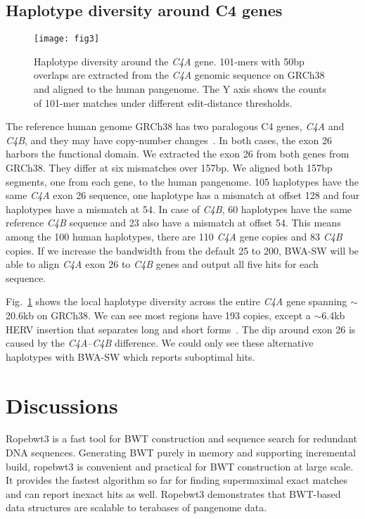 \documentclass[webpdf,contemporary,large,namedate]{oup-authoring-template}%
\begin{document}
\subsection{Haplotype diversity around C4 genes}

\begin{figure}[tb]
\texttt{[image: fig3]}
\caption{Haplotype diversity around the \emph{C4A} gene.
101-mers with 50bp overlaps are extracted from the \emph{C4A} genomic sequence on GRCh38
and aligned to the human pangenome.
The Y axis shows the counts of 101-mer matches under different edit-distance thresholds.}\label{fig:c4}
\end{figure}

The reference human genome GRCh38 has two paralogous C4 genes, \emph{C4A} and \emph{C4B}, and they may have copy-number changes~\citep{Sekar:2016aa}.
In both cases, the exon 26 harbors the functional domain.
We extracted the exon 26 from both genes from GRCh38.
They differ at six mismatches over 157bp.
We aligned both 157bp segments, one from each gene, to the human pangenome.
105 haplotypes have the same \emph{C4A} exon 26 sequence, one haplotype has a mismatch at offset 128 and four haplotypes have a mismatch at 54.
In case of \emph{C4B}, 60 haplotypes have the same reference \emph{C4B} sequence and 23 also have a mismatch at offset 54.
This means among the 100 human haplotypes, there are 110 \emph{C4A} gene copies and 83 \emph{C4B} copies.
If we increase the bandwidth from the default 25 to 200, BWA-SW will be able to align \emph{C4A} exon 26 to \emph{C4B} genes
and output all five hits for each sequence.

Fig.~\ref{fig:c4} shows the local haplotype diversity across the entire \emph{C4A} gene spanning $\sim$20.6kb on GRCh38.
We can see most regions have 193 copies, except a $\sim$6.4kb HERV insertion that separates long and short forms~\citep{Sekar:2016aa}.
The dip around exon 26 is caused by the \emph{C4A}--\emph{C4B} difference.
We could only see these alternative haplotypes with BWA-SW which reports suboptimal hits.

\section{Discussions}

Ropebwt3 is a fast tool for BWT construction and sequence search for redundant DNA sequences.
Generating BWT purely in memory and supporting incremental build, ropebwt3 is convenient and practical for BWT construction at large scale.
It provides the fastest algorithm so far for finding supermaximal exact matches and can report inexact hits as well.
Ropebwt3 demonstrates that BWT-based data structures are scalable to terabases of pangenome data.
\end{document}
